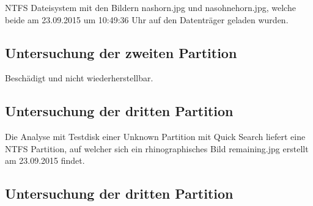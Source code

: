 NTFS Dateisystem mit den Bildern nashorn.jpg und nasohnehorn.jpg, welche beide am 23.09.2015 um 10:49:36 Uhr auf den Datenträger geladen wurden.

\subsection{Untersuchung der zweiten Partition}

Beschädigt und nicht wiederherstellbar.

\subsection{Untersuchung der dritten Partition}

Die Analyse mit Testdisk einer Unknown Partition mit Quick Search liefert eine NTFS Partition, auf welcher sich ein rhinographisches Bild remaining.jpg erstellt am 23.09.2015 findet.

\subsection{Untersuchung der dritten Partition}